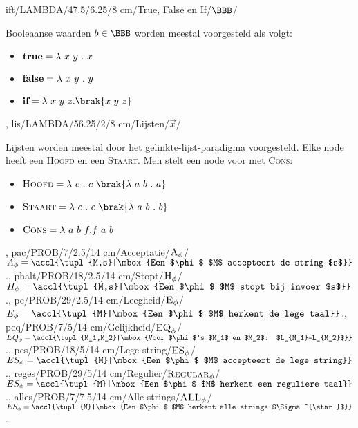 ift/LAMBDA/47.5/6.25/8 cm/{True, False en If}/$\BBB$/{Booleaanse waarden $b\in\BBB$ worden meestal voorgesteld als volgt:\begin{itemize}\item $\mbox{\bf true}=\lambda\ x\ y\ .\ x$\item $\mbox{\bf false}=\lambda\ x\ y\ .\ y$\item $\mbox{\bf if}=\lambda\ x\ y\ z.\brak{x\ y\ z}$\end{itemize}},
lis/LAMBDA/56.25/2/8 cm/{Lijsten}/$\vec{x}$/{Lijsten worden meestal door het gelinkte-lijst-paradigma voorgesteld. Elke node heeft een \textsc{Hoofd} en een \textsc{Staart}. Men stelt een node voor met \textsc{Cons}:\begin{itemize}\item $\mbox{\sc Hoofd}=\lambda\ c\ .\ c\ \brak{\lambda\ a\ b\ .\ a}$\item $\mbox{\sc Staart}=\lambda\ c\ .\ c\ \brak{\lambda\ a\ b\ .\ b}$\item $\mbox{\sc Cons}=\lambda\ a\ b\ f.f\ a\ b$\end{itemize}},
pac/PROB/7/2.5/14 cm/Acceptatie/$\mbox{\textsc{A}}_{\phi}$/{$A_{\phi}=\accl{\tupl{M,s}|\mbox{Een $\phi$ $M$ accepteert de string $s$}}$.},
phalt/PROB/18/2.5/14 cm/Stopt/$\mbox{\textsc{H}}_{\phi}$/{$H_{\phi}=\accl{\tupl{M,s}|\mbox{Een $\phi$ $M$ stopt bij invoer $s$}}$.},
pe/PROB/29/2.5/14 cm/Leegheid/$\mbox{\textsc{E}}_{\phi}$/{$E_{\phi}=\accl{\tupl{M}|\mbox{Een $\phi$ $M$ herkent de lege taal}}$.},
peq/PROB/7/5/14 cm/Gelijkheid/$\mbox{\textsc{EQ}}_{\phi}$/{$EQ_{\phi}=\accl{\tupl{M_1,M_2}|\mbox{Voor $\phi$'s $M_1$ en $M_2$: $L_{M_1}=L_{M_2}$}}$.},
pes/PROB/18/5/14 cm/Lege string/$\mbox{\textsc{ES}}_{\phi}$/{$ES_{\phi}=\accl{\tupl{M}|\mbox{Een $\phi$ $M$ accepteert de lege string}}$.},
reges/PROB/29/5/14 cm/Regulier/$\mbox{\textsc{Regular}}_{\phi}$/{$ES_{\phi}=\accl{\tupl{M}|\mbox{Een $\phi$ $M$ herkent een reguliere taal}}$.},
alles/PROB/7/7.5/14 cm/Alle strings/$\mbox{\textsc{ALL}}_{\phi}$/{$ES_{\phi}=\accl{\tupl{M}|\mbox{Een $\phi$ $M$ herkent alle strings $\Sigma^{\star}$}}$.}